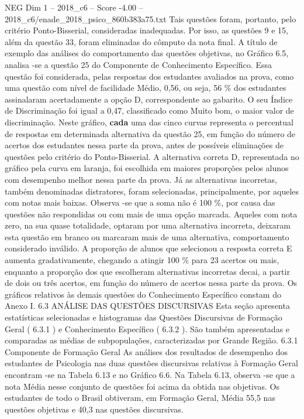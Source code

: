 \begin{textsample}{NEG Dim 1 – 2018\_c6 – Score -4.00 – 2018\_c6/enade\_2018\_psico\_860b383a75.txt}
Tais questões foram, portanto, pelo critério Ponto-Bisserial, consideradas inadequadas.
Por isso, as questões 9 e 15, além da questão 33, foram eliminadas do cômputo da nota final.
A título de exemplo das análises do comportamento das questões objetivas, no Gráfico 6.5, analisa -se a questão 25 do Componente de Conhecimento Específico.
Essa questão foi considerada, pelas respostas dos estudantes avaliados na prova, como uma questão com nível de facilidade Médio, 0,56, ou seja, 56 \% dos estudantes assinalaram acertadamente a opção D, correspondente ao gabarito.
O seu Índice de Discriminação foi igual a 0,47, classificado como Muito bom, o maior valor de discriminação.
Neste gráfico, \textbf{cada} uma das cinco curvas representa o percentual de respostas em determinada alternativa da questão 25, em função do número de acertos dos estudantes nessa parte da prova, antes de possíveis eliminações de questões pelo critério do Ponto-Bisserial.
A alternativa correta D, representada no gráfico pela curva em laranja, foi escolhida em maiores proporções pelos alunos com desempenho melhor nessa parte da prova.
Já as alternativas incorretas, também denominadas distratores, foram selecionadas, principalmente, por aqueles com notas mais baixas.
Observa -se que a soma não é 100 \%, por causa das questões não respondidas ou com mais de uma opção marcada.
Aqueles com nota zero, na sua quase totalidade, optaram por uma alternativa incorreta, deixaram esta questão em branco ou marcaram mais de uma alternativa, comportamento considerado inválido.
A proporção de alunos que selecionou a resposta correta E aumenta gradativamente, chegando a atingir 100 \% para 23 acertos ou mais, enquanto a proporção dos que escolheram alternativas incorretas decai, a partir de dois ou três acertos, em função do número de acertos nessa parte da prova.
Os gráficos relativos às demais questões do Conhecimento Específico constam do Anexo I. 6.3 ANÁLISE DAS QUESTÕES DISCURSIVAS Esta seção apresenta estatísticas selecionadas e histogramas das Questões Discursivas de Formação Geral ( 6.3.1 ) e Conhecimento Específico ( 6.3.2 ).
São também apresentadas e comparadas as médias de subpopulações, caracterizadas por Grande Região. 6.3.1 Componente de Formação Geral As análises dos resultados de desempenho dos estudantes de Psicologia nas duas questões discursivas relativas à Formação Geral encontram -se na Tabela 6.13 e no Gráfico 6.6.
Na Tabela 6.13, observa -se que a nota Média nesse conjunto de questões foi acima da obtida nas objetivas.
Os estudantes de todo o Brasil obtiveram, em Formação Geral, Média 55,5 nas questões objetivas e 40,3 nas questões discursivas.

\end{textsample}
